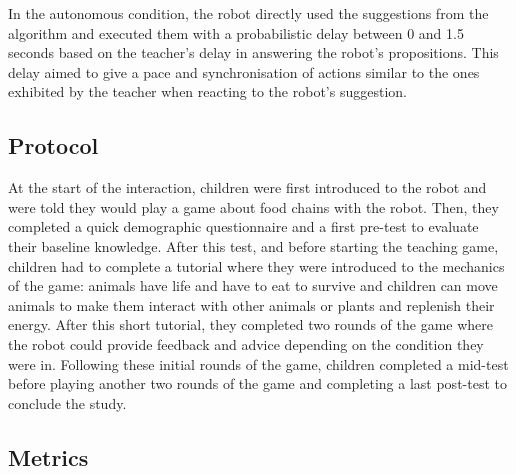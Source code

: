 In the autonomous condition, the robot directly used the suggestions from the algorithm and executed them with a probabilistic delay between 0 and 1.5 seconds based on the teacher's delay in answering the robot's propositions. This delay aimed to give a pace and synchronisation of actions similar to the ones exhibited by the teacher when reacting to the robot's suggestion.

\subsection{Protocol}

At the start of the interaction, children were first introduced to the robot and were told they would play a game about food chains with the robot. Then, they completed a quick demographic questionnaire and a first pre-test to evaluate their baseline knowledge. After this test, and before starting the teaching game, children had to complete a tutorial where they were introduced to the mechanics of the game: animals have life and have to eat to survive and children can move animals to make them interact with other animals or plants and replenish their energy. After this short tutorial, they completed two rounds of the game where the robot could provide feedback and advice depending on the condition they were in. Following these initial rounds of the game, children completed a mid-test before playing another two rounds of the game and completing a last post-test to conclude the study. 


\subsection{Metrics}


